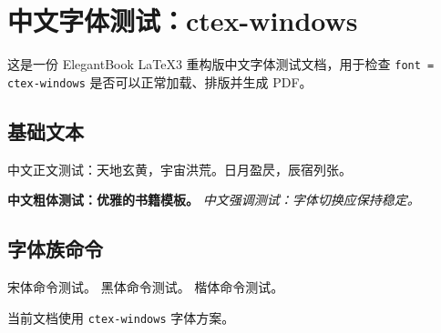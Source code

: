 \documentclass[lang = cn, font = ctex-windows, mode = simple]{elegantbook-l3}
\begin{document}
\frontmatter
\tableofcontents

\mainmatter
\chapter{中文字体测试：ctex-windows}

这是一份 ElegantBook LaTeX3 重构版中文字体测试文档，用于检查
\texttt{font = ctex-windows} 是否可以正常加载、排版并生成 PDF。

\section{基础文本}

中文正文测试：天地玄黄，宇宙洪荒。日月盈昃，辰宿列张。

\textbf{中文粗体测试：优雅的书籍模板。}
\emph{中文强调测试：字体切换应保持稳定。}

\section{字体族命令}

{\songti 宋体命令测试。}
{\heiti 黑体命令测试。}
{\kaishu 楷体命令测试。}

\begin{theorem}[字体方案]
  当前文档使用 \texttt{ctex-windows} 字体方案。
\end{theorem}
\end{document}
